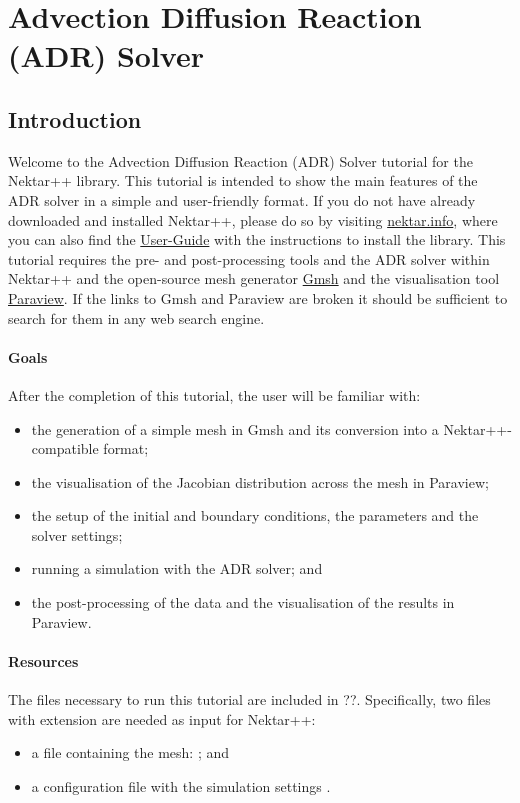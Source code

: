 \chapter{Advection Diffusion Reaction (ADR) Solver}
\label{ADR}

\section*{\Large Introduction}
Welcome to the Advection Diffusion Reaction (ADR) Solver tutorial for
the Nektar++ library.  This tutorial is intended to show the main
features of the ADR solver in a simple and user-friendly format. If
you do not have already downloaded and installed Nektar++, please do
so by visiting \href{http://www.nektar.info}{nektar.info}, where you
can also find the
\href{http://www.nektar.info/downloads/8}{User-Guide} with the
instructions to install the library. This tutorial requires the pre-
and post-processing tools and the ADR solver within Nektar++ and the
open-source mesh generator \href{http://geuz.org/gmsh/}{Gmsh} and the
visualisation tool \href{http://www.paraview.org}{Paraview}. If the
links to Gmsh and Paraview are broken it should be sufficient to
search for them in any web search engine.


\subsubsection*{Goals}
After the completion of this tutorial, the user will be familiar with:
\vspace{-0.5cm}
\begin{itemize}
\item the generation of a simple mesh in Gmsh and its conversion into a Nektar++-compatible format;
\item the visualisation of the Jacobian distribution across the mesh in Paraview;
\item the setup of the initial and boundary conditions, the parameters and the solver settings;
\item running a simulation with the ADR solver; and
\item the post-processing of the data and the visualisation of the results in Paraview.
\end{itemize}

\subsubsection*{Resources}
The files necessary to run this tutorial are included in ??.  
Specifically, two files with extension  are needed as input for Nektar++: 
\vspace{-0.5cm}
\begin{itemize}
\item a file containing the mesh: ; and 
\item a configuration file with the simulation settings .
\end{itemize}

